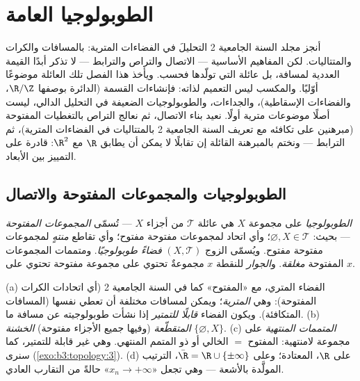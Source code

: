 \chapter{الطوبولوجيا العامة}\label{ch:b3:topology}

أنجز مجلد السنة الجامعية 2 التحليلَ في الفضاءات المترية:
بالمسافات والكرات والمتتاليات. لكن المفاهيم الأساسية ---
الاتصال والتراص والترابط --- لا تذكر أبدًا القيمة العددية
لمسافة، بل عائلة \emph{} التي تولّدها فحسب.
ويأخذ هذا الفصل تلك العائلة موضوعًا أوّليًا. والمكسب ليس التعميم
لذاته: فإنشاءات القسمة (الدائرة بوصفها $\R/\Z$، والفضاءات
الإسقاطية)، والجداءات، والطوبولوجيات الضعيفة في التحليل الدالي،
ليست أصلًا موضوعات مترية أولًا. نعيد بناء الاتصال، ثم نعالج
التراص بالتغطيات المفتوحة (مبرهنين على تكافئه مع تعريف السنة
الجامعية 2 بالمتتاليات في الفضاءات المترية)، ثم الترابط ---
ونختم بالمبرهنة القائلة إن تقابلًا  لا يمكن أن يطابق $\R$
مع $\R^2$:  قادرة على التمييز بين الأبعاد.

\section{الطوبولوجيات والمجموعات المفتوحة والاتصال}

\begin{definition}\label{def:b3:topology:topology}
\emph{الطوبولوجيا} على مجموعة $X$ هي عائلة
$\mathcal T$ من أجزاء $X$ --- تُسمّى \emph{المجموعات
المفتوحة} --- بحيث: $\varnothing, X \in
\mathcal T$؛ وأي اتحاد
لمجموعات مفتوحة مفتوح؛ وأي تقاطع \emph{منتهٍ} لمجموعات مفتوحة
مفتوح. ويُسمّى الزوج $(X, \mathcal T)$ \emph{فضاءً طوبولوجيًا}. ومتممات
المجموعات المفتوحة \emph{مغلقة}. و\emph{الجوار}
للنقطة $x$ مجموعةٌ تحتوي على مجموعة مفتوحة تحتوي على $x$.
\end{definition}

\begin{example}\label{ex:b3:topology:examples}
(a) الفضاء المتري، مع «المفتوح» كما في السنة الجامعية 2 (أي
اتحادات الكرات المفتوحة): وهي \emph{ المترية}؛ ويمكن
لمسافات مختلفة أن تعطي  نفسها (المسافات المتكافئة).
ويكون الفضاء \emph{قابلًا للتمتير} إذا نشأت طوبولوجيته عن مسافة
ما.
(b)  \emph{المتقطّعة} (وفيها جميع الأجزاء مفتوحة)
 \emph{الخشنة} $\{\varnothing, X\}$.
(c)  \emph{المتممات المنتهية} على مجموعة لامنتهية:
المفتوح $=$ الخالي أو ذو المتمم المنتهي. وهي غير قابلة للتمتير،
كما سنرى (\cref{exo:b3:topology:3}).
(d) على $\R$،  المعتادة؛ وعلى $\bar\R = \R \cup
\{\pm\infty\}$، 
الترتيب المولَّدة بالأشعة --- وهي تجعل «$x_n \to +\infty$» حالةً من
التقارب العادي.
\end{example}

